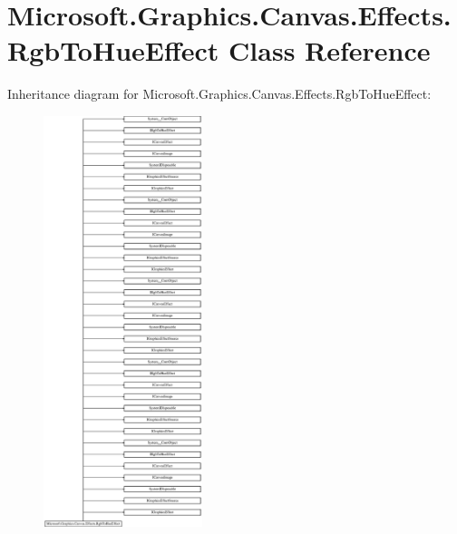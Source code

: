 \hypertarget{class_microsoft_1_1_graphics_1_1_canvas_1_1_effects_1_1_rgb_to_hue_effect}{}\section{Microsoft.\+Graphics.\+Canvas.\+Effects.\+Rgb\+To\+Hue\+Effect Class Reference}
\label{class_microsoft_1_1_graphics_1_1_canvas_1_1_effects_1_1_rgb_to_hue_effect}
Inheritance diagram for Microsoft.\+Graphics.\+Canvas.\+Effects.\+Rgb\+To\+Hue\+Effect\+:\begin{figure}[H]
\begin{center}
\leavevmode
\includegraphics[height=12.000000cm]{class_microsoft_1_1_graphics_1_1_canvas_1_1_effects_1_1_rgb_to_hue_effect}
\end{center}
\end{figure}
